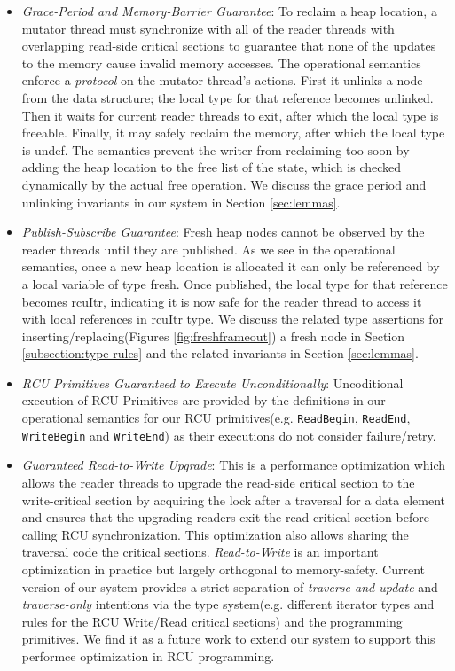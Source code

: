 \begin{itemize}
  \item \textit{Grace-Period and Memory-Barrier Guarantee}: To reclaim a heap location, a mutator thread must synchronize with all of the reader threads with overlapping read-side critical sections to guarantee that none of the updates to the memory cause invalid memory accesses.
The operational semantics enforce a \textit{protocol} on the mutator thread's actions. First it unlinks a node from the data structure; the local type for that reference becomes \textsf{unlinked}. Then it waits for current reader threads to exit, after which the local type is \textsf{freeable}. Finally, it may safely reclaim the memory, after which the local type is \textsf{undef}.
The semantics prevent the writer from reclaiming too soon by adding the heap location to the free list of the state, which is checked dynamically by the actual free operation. We discuss the grace period and unlinking invariants in our system in Section \ref{sec:lemmas}.
\item \textit{Publish-Subscribe Guarantee}: Fresh heap nodes cannot be observed by the reader threads until they are published. As we see in the operational semantics, once a new heap location is allocated it can only be referenced by a local variable of type \textsf{fresh}. Once published, the local type for that reference becomes \textsf{rcuItr}, indicating it is now safe for the reader thread to access it with local references in \textsf{rcuItr} type. We discuss the related type assertions for inserting/replacing(Figures \ref{fig:freshframeout}) a fresh node in Section \ref{subsection:type-rules} and the related invariants in Section \ref{sec:lemmas}.
\item \textit{RCU Primitives Guaranteed to Execute Unconditionally}: Uncoditional execution of RCU Primitives are provided by the definitions in our operational semantics for our RCU primitives(e.g. \lstinline|ReadBegin|, \lstinline|ReadEnd|, \lstinline|WriteBegin| and \lstinline|WriteEnd|) as their executions do not consider failure/retry.
\item \textit{Guaranteed Read-to-Write Upgrade}: This is a performance optimization which allows the reader threads to upgrade the read-side critical section to the write-critical section by acquiring the lock after a traversal for a data element and ensures that the upgrading-readers exit the read-critical section before calling RCU synchronization. This optimization also allows sharing the traversal code the critical sections. \textit{Read-to-Write} is an important optimization in practice but largely orthogonal to memory-safety. Current version of our system provides a strict separation of \textit{traverse-and-update} and \textit{traverse-only} intentions via the type system(e.g. different iterator types and rules for the RCU Write/Read critical sections) and the programming primitives. We find it as a future work to extend our system to support this performce optimization in RCU programming.
  \end{itemize}
